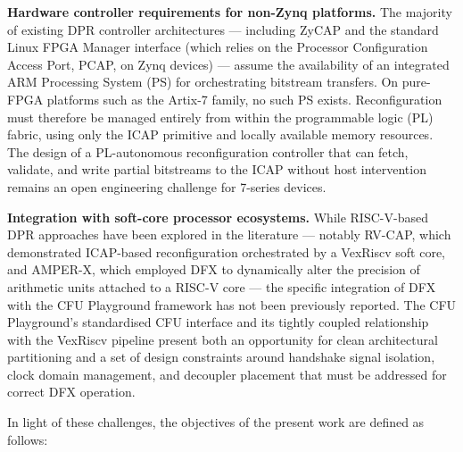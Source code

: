 \textbf{Hardware controller requirements for non-Zynq platforms.} The majority of existing DPR controller architectures — including ZyCAP and the standard Linux FPGA Manager interface (which relies on the Processor Configuration Access Port, PCAP, on Zynq devices) — assume the availability of an integrated ARM Processing System (PS) for orchestrating bitstream transfers. On pure-FPGA platforms such as the Artix-7 family, no such PS exists. Reconfiguration must therefore be managed entirely from within the programmable logic (PL) fabric, using only the ICAP primitive and locally available memory resources. The design of a PL-autonomous reconfiguration controller that can fetch, validate, and write partial bitstreams to the ICAP without host intervention remains an open engineering challenge for 7-series devices.

\textbf{Integration with soft-core processor ecosystems.} While RISC-V-based DPR approaches have been explored in the literature — notably RV-CAP, which demonstrated ICAP-based reconfiguration orchestrated by a VexRiscv soft core, and AMPER-X, which employed DFX to dynamically alter the precision of arithmetic units attached to a RISC-V core — the specific integration of DFX with the CFU Playground framework has not been previously reported. The CFU Playground's standardised CFU interface and its tightly coupled relationship with the VexRiscv pipeline present both an opportunity for clean architectural partitioning and a set of design constraints around handshake signal isolation, clock domain management, and decoupler placement that must be addressed for correct DFX operation.

In light of these challenges, the objectives of the present work are defined as follows:

